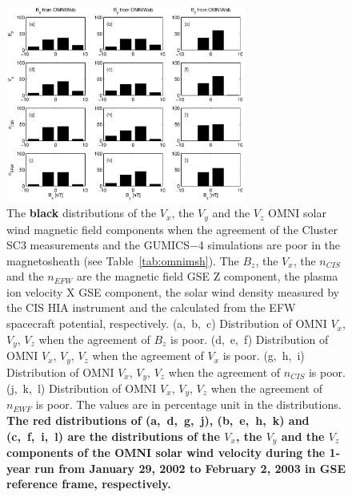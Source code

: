 \documentclass[linenumbers,draft]{agujournal}
\begin{document}
\begin{figure}[h]
\centering
\includegraphics[width=0.7\textwidth,angle=0]{swe-2020-corr-f17}
\caption{The \textbf{black} distributions of the $V_{x}$, the $V_{y}$  and the $V_{z}$ OMNI solar wind magnetic field components when the agreement of the Cluster SC3 measurements and the GUMICS$-$4 simulations are poor in the magnetosheath (see Table~\ref{tab:omnimsh}). The $B_{z}$, the $V_{x}$, the $n_{CIS}$ and the $n_{EFW}$ are the magnetic field GSE Z component, the plasma ion velocity X GSE component, the  solar wind density measured by the CIS HIA instrument and the calculated from the EFW spacecraft potential, respectively. (a,~b,~c) Distribution of OMNI $V_{x}$, $V_{y}$, $V_{z}$ when the agreement of $B_{z}$ is poor. (d,~e,~f) Distribution of OMNI  $V_{x}$, $V_{y}$, $V_{z}$ when the agreement of $V_{x}$ is poor. (g,~h,~i) Distribution of OMNI $V_{x}$, $V_{y}$, $V_{z}$ when the agreement of $n_{CIS}$ is poor. (j,~k,~l) Distribution of OMNI $V_{x}$, $V_{y}$, $V_{z}$ when the agreement of $n_{EWF}$ is poor. The values are in percentage unit in the distributions. \textbf{The red distributions of (a,~d,~g,~j), (b,~e,~h,~k) and (c,~f,~i,~l) are the distributions of the $V_{x}$, the $V_{y}$ and the $V_{z}$ components of the OMNI solar wind velocity during the 1-year run from January 29, 2002 to February 2, 2003 in GSE reference frame, respectively.}}
\label{fig:mshomnivxyz}
\end{figure}

\pagebreak
\end{document}
